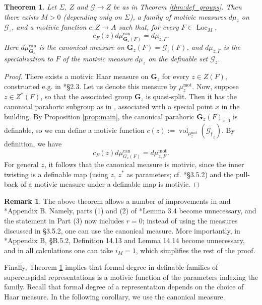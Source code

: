 \documentclass{amsart}
\newcommand{\cG}{\mathcal{G}}
\DeclareMathOperator{\vol}{vol}
\DeclareMathOperator{\loc}{Loc}
\newcommand{\bG}{\mathbf{G}}
\newcommand{\can}{\mathrm{can}}
\newcommand{\ff}{{\mathfrak f}}
\newcommand\mot{\mathrm{mot}}
\theoremstyle{plain}
\newtheorem{theorem}[thm]{Theorem}
\theoremstyle{definition}
\newtheorem{rem}[thm]{Remark}
\begin{document}
\begin{theorem}\label{thm:mot_meas}
 Let $\Sigma$, $Z$  and $\cG \to Z$ be as in Theorem \ref{thm:def_groups}. 
Then there exists $M>0$ (depending only on $\Sigma$), a family of  motivic measures
$d\mu_z$ on $\cG_z$, and a motivic function $c:Z\to A$ such that, for every $F\in \loc_M$,
\[
c_F(z) d\mu_{\bG_z(F)}^\can = d\mu_{z, F}.
\]
Here $d\mu_{\bG_z}^\can$ is the canonical measure on $\bG_z(F)=\cG_z(F)$,
and $d\mu_{z, F}$ is the specialization to $F$ of the motivic measure $d\mu_z$ on the definable set $\cG_z$. 
\end{theorem} 

\begin{proof} There exists a motivic Haar measure on $\bG_z$ for every $z\in Z(F)$,
constructed e.g. in \cite{hales:transfert}*{\S 2.3}. Let us denote this measure by $\mu_z^\mot$. Now, suppose 
$z\in Z^\ast(F)$, so that the associated group $\bG_z$ is quasi-split.  
Then it has the canonical parahoric subgroup as in \cite{gross:motive}, associated with a special point $x$ in the building. 
By Proposition \ref{prop:main}, the canonical parahoric $\bG_z(F)_{x, 0}$ is definable, so we can define  a motivic function $c(z):=\vol_{\mu_z^\mot}({\cG_{\ff}}_z)$. 
By definition, we have 
\[
c_F(z) d\mu_{G_z(F)}^\can = d\mu_{z, F}^\mot.
\]
For general $z$, it follows that the canonical measure is motivic, since the inner twisting is a definable map
(using $z$, $z^\ast$ as parameters; cf. \cite{CGH-2}*{\S 3.5.2}) and the pull-back of a motivic measure under a definable map is motivic.
\end{proof}

\begin{rem} The above theorem allows a number of improvements in \cite{CGH-2} and 
\cite{S-T}*{Appendix B}. 
Namely,  parts (1) and (2) of \cite{CGH-2}*{Lemma 3.4} become unnecessary, and the statement in Part (3)
now includes $r=0$; instead of using the measures discussed in \S 3.5.2, one can use the canonical measure. 
More importantly, in \cite{S-T}*{Appendix B, \S B.5.2}, Definition 14.13 and Lemma 14.14
become unnecessary, and in all calculations one can take $i_M=1$, which simplifies the rest of the proof.
\end{rem}




Finally, Theorem \ref{thm:mot_meas} implies that formal degree in definable families of
supercuspidal representations is a motivic function of the parameters indexing the family. 
Recall that formal degree of a representation depends on the choice of Haar measure. 
In the following corollary, we use the canonical measure. 
 
\end{document}
